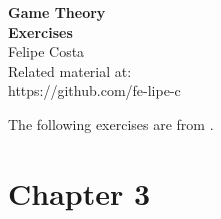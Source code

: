 \documentclass[10pt]{report}
\newcommand{\DOI}{https://github.com/fe-lipe-c}
\begin{document}
\begin{titlepage}
	\begin{flushright}
		\LARGE{\textbf{Game Theory}}\\
		\vfill
		\Huge{\textbf{Exercises}}\\
		\vfill
		\large Felipe Costa\\
		\vfill
		\normalsize Related material at:\\
		\DOI
		\vfill
	\end{flushright}
\end{titlepage}

\begin{center}
	\tableofcontents
\end{center}

\pagebreak

The following exercises are from \cite{maschler_solan_zamir_2020}.

\section{Chapter 3}
\end{document}
